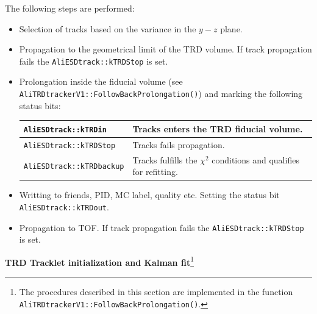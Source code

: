 \documentclass{alicetdr}
\begin{document}
The following steps are performed:
\begin{itemize}
\item[1.] Selection of tracks based on the variance in the $y-z$ plane.
\item[2.] Propagation to the geometrical limit of the TRD volume. If track 
          propagation fails the {\tt AliESDtrack::kTRDStop} is set.
\item[3.] Prolongation inside the fiducial volume (see 
          {\tt AliTRDtrackerV1::FollowBackProlonga\-tion()}) and marking
          the following status bits:
          \begin{center}
          \begin{tabular}{|l|l|}  \hline
          {\tt AliESDtrack::kTRDin}     & Tracks enters the TRD fiducial volume.  \\ \hline
          {\tt AliESDtrack::kTRDStop}   & Tracks fails propagation.               \\ \hline
          {\tt AliESDtrack::kTRDbackup} & Tracks fulfills the $\chi^{2}$ 
                                          conditions and qualifies for refitting. \\ \hline
          \end{tabular}
          \end{center}
\item[4.] Writting to friends, PID, MC label, quality etc. Setting the status bit 
          {\tt AliESDtrack::kTRDout}.
\item[5.] Propagation to TOF. If track propagation fails the {\tt AliESDtrack::kTRDStop} 
          is set.
\end{itemize}


\noindent
{\bf TRD Tracklet initialization and Kalman fit}\footnote{The procedures 
described in this section are implemented in the function 
{\tt AliTRDtrackerV1::FollowBackProlongation()}.}
\\
\end{document}
